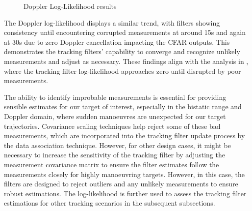 \begin{figure}[H]
    \centering
    
    \caption{Doppler Log-Likelihood results}
    \label{fig:dopplerLogLikeP}
\end{figure}

The Doppler log-likelihood displays a similar trend, with filters showing consistency until encountering corrupted measurements at around 15s and again at 30s due to zero Doppler cancellation impacting the \ac{CFAR} outputs. This demonstrates the tracking filters' capability to converge and recognize unlikely measurements and adjust as necessary. These findings align with the analysis in \cite{labbe2014kalman}, where the tracking filter log-likelihood approaches zero until disrupted by poor measurements. 

The ability to identify improbable measurements is essential for providing sensible estimates for our target of interest, especially in the bistatic range and Doppler domain, where sudden manoeuvres are unexpected for our target trajectories. Covariance scaling techniques help reject some of these bad measurements, which are incorporated into the tracking filter update process by the data association technique. However, for other design cases, it might be necessary to increase the sensitivity of the tracking filter by adjusting the measurement covariance matrix to ensure the filter estimates follow the measurements closely for highly manoeuvring targets. However, in this case, the filters are designed to reject outliers and any unlikely measurements to ensure robust estimations. The log-likelihood is further used to assess the tracking filter estimations for other tracking scenarios in the subsequent subsections.

